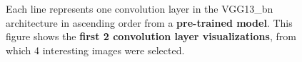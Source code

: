 \begin{figure}[!h]
\centering
\caption{Each line represents one convolution layer in the VGG13\_bn architecture in ascending order from a \textbf{pre-trained model}. This figure shows the \textbf{first 2 convolution layer visualizations}, from which 4 interesting images were selected.}



\end{figure}
